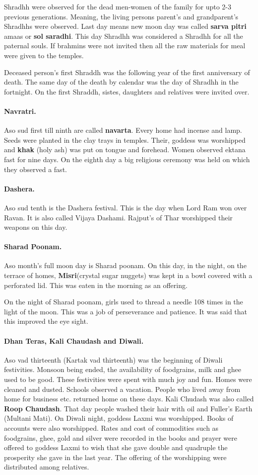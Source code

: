 Shradhh were observed for the dead men-women of the family for upto 2-3
previous generations. Meaning, the living persons parent's and grandparent's
Shradhhs were observed. Last day means new moon day was called \textbf{sarva
pitri} amaas or \textbf{sol saradhi}. This day Shradhh was considered a Shradhh
for all the paternal souls. If brahmins were not invited then all the raw
materials for meal were given to the temples.

Deceased person's first Shraddh was the following year of the first anniversary
of death. The same day of the death by calendar was the day of Shradhh in the
fortnight. On the first Shraddh, sistes, daughters and relatives were invited
over. 
\paragraph{Navratri.} Aso sud first till ninth are called \textbf{navarta}.
Every home had incense and lamp. Seeds were planted in the clay trays in
temples. Their, goddess was worshipped and \textbf{khak} (holy ash) was put on
tongue and forehead. Women observed ektana fast for nine days. On the eighth day
a big religious ceremony was held on which they observed a fast.
\paragraph{Dashera.} Aso sud tenth is the Dashera festival. This is the day when
Lord Ram won over Ravan. It is also called Vijaya Dashami. Rajput's of Thar
worshipped their weapons on this day.
\paragraph{Sharad Poonam.} Aso month's full moon day is Sharad poonam. On this
day, in the night, on the terrace of homes, \textbf{Misri}(crystal sugar
nuggets) was kept in a bowl covered with a perforated lid. This was eaten in the
morning as an offering.

On the night of Sharad poonam, girls used to thread a needle 108 times in the
light of the moon. This was a job of perseverance and patience. It was said that
this improved the eye sight.
\paragraph{Dhan Teras, Kali Chaudash and Diwali.} Aso vad thirteenth (Kartak vad
thirteenth) was the beginning of Diwali festivities. Monsoon being ended, the
availability of foodgrains, milk and ghee used to be good. These festivities
were spent with much joy and fun. Homes were cleaned and dusted. Schools
observed a vacation. People who lived away from home for business etc. returned
home on these days. Kali Chudash was also called \textbf{Roop Chaudash}. That
day people washed their hair with oil and Fuller's Earth (Multani Mati). On Diwali
night, goddess Laxmi was worshipped. Books of accounts were also worshipped.
Rates and cost of commodities such as foodgrains, ghee, gold and silver were
recorded in the books and prayer were offered to goddess Laxmi to wish that she
gave double and quadruple the prosperity she gave in the last year. The offering
of the worshipping were distributed among relatives.

